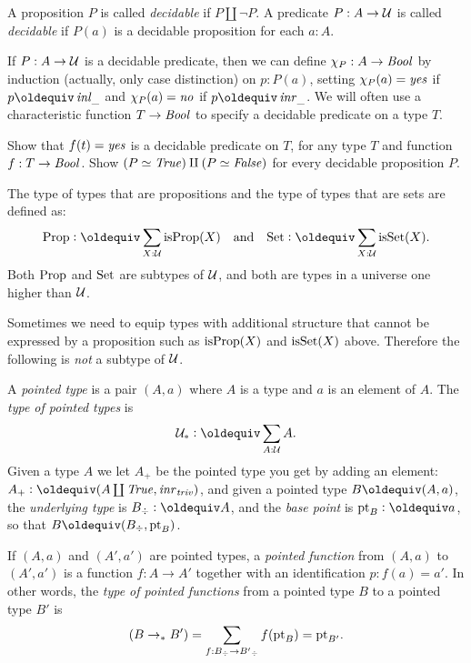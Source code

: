 \begin{definition}\label{def:decidability}
A proposition $P$ is called \emph{decidable} if $P\amalg\neg P$.
A predicate $P: A\to\mathcal{U}$ is called \emph{decidable} if 
$P(a)$ is a decidable proposition for each $a:A$.
\end{definition}

If $P: A\to\mathcal{U}$ is a decidable predicate, then
we can define $\chi_P: A\to\mathop{\mathit{Bool}}$ by induction (actually,
only case distinction) on $p:P(a)$, setting $\chi_P(a)=\mathop{\mathit{yes}}$
if $p\jdeq\inl{\_}$ and $\chi_P(a)=\mathop{\mathit{no}}$ if $p\jdeq\inr{\_}$.
We will often use a characteristic function $T\to\mathop{\mathit{Bool}}$ to
specify a decidable predicate on a type $T$.

\begin{xca}\label{xca:decidability}
Show that $f(t)=\mathop{\mathit{yes}}$ is a decidable predicate on $T$,
for any type $T$ and function $f:T\to\mathop{\mathit{Bool}}$.
Show $(P\simeq\mathop{\mathit{True}})\amalg(P\simeq\mathop{\mathit{False}})$ for every decidable
proposition $P$. 
\end{xca}

\begin{definition}\label{def:Prop-Set}
The type of types that are propositions and the 
type of types that are sets are defined as:
\[\Prop\defeq \sum_{X:\UU}\isprop(X)\quad
\text{and}\quad\Set\defeq \sum_{X:\UU}\isset(X).\]
Both $\mathord{\mathrm{Prop}}$ and $\mathord{\mathrm{Set}}$ are subtypes of $\mathcal{U}$, and
both are types in a universe one higher than $\mathcal{U}$. 
\end{definition}

Sometimes we need to equip types with additional structure
that cannot be expressed by a proposition such as
$\mathrm{isProp}(X)$ and $\mathrm{isSet}(X)$ above. 
Therefore the following is \emph{not} a subtype of $\mathcal{U}$.

\begin{definition}\label{def:pointedtypes}
 A \emph{pointed type} is a pair $(A,a)$ where $A$ is a type
 and $a$ is an element of $A$. The \emph{type of pointed types} is
\[\UUp \defeq \sum_{A:\UU} A.\]
Given a type $A$ we let $A_+$ be the pointed type you get 
by adding an element: $A_+\defequi(A\coprod\true,\inr{\triv})$, 
and given a pointed type $B\jdeq(A,a)$, the \emph{underlying type} 
is $B_\div\defeq A$, and the \emph{base point} is $\pt_B\defeq a$, 
so that $B\jdeq (B_\div,\pt_B)$.  

If $(A,a)$ and $(A',a')$ are pointed types, 
a \emph{pointed function} from  $(A,a)$ to $(A',a')$ is 
a function $f:A\to A'$ together with an identification $p:f(a)=a'$. 
In other words, the \emph{type of pointed functions} from a pointed 
type $B$ to a pointed type $B'$ is
\[(B\to_*B')=\sum_{f:B_\div\to B'{}_\div}f({\mathord{\mathrm{pt}}}_B)={\mathord{\mathrm{pt}}}_{B'}.\]
\end{definition}

